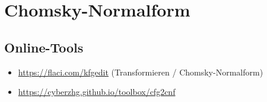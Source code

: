 \documentclass{lehramt-informatik-haupt}
\begin{document}
\chapter{Chomsky-Normalform}

\section{Online-Tools}

\begin{quellen}
\item \cite[Seite 35-37]{theo:fs:2}
\item \cite[Seite 179-181]{hoffmann}
\end{quellen}

\begin{itemize}
\item \url{https://flaci.com/kfgedit} (Transformieren / Chomsky-Normalform)
\item \url{https://cyberzhg.github.io/toolbox/cfg2cnf}
\end{itemize}

\literatur
\end{document}
